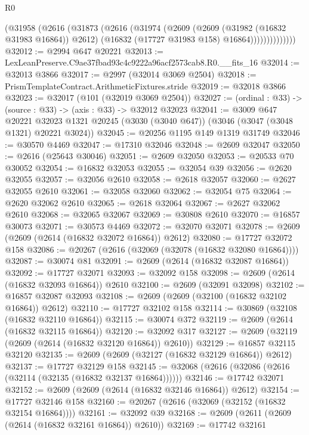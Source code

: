 \begin{lexlean}{R0}
\begin{coremodule}
                  (@31958
                    (@2616
                      (@31873
                        (@2616
                          (@31974
                            (@2609
                              (@2609 (@31982 (@16832 @31983 @16864)) @2612)
                              (@16832 (@17727 @31983 @158) @16864))))))))))))))
@32012 := @2994 @647 @20221
@32013 := LexLeanPreserve.C9ae37fbad93c4c9222a96acf2573cab8.R0.__fits_16
@32014 := @32013 @3866
@32017 := @2997 (@32014 @3069 @2504)
@32018 := PrismTemplateContract.ArithmeticFixtures.stride
@32019 := @32018 @3866
@32023 := @32017 (@101 (@32019 @3069 @2504))
@32027 := (ordinal : @33) -> (source : @33) -> (axis : @33) -> @32012 @32023
@32041 := @3009
    @647
    @20221
    @32023
    @1321
    @20245
    (@3030 (@3040 @647))
    (@3046 (@3047 (@3048 @1321) @20221 @3024))
@32045 := @20256 @1195 @149 @1319 @31749
@32046 := @30570 @4469
@32047 := @17310 @32046
@32048 := @2609 @32047
@32050 := @2616 (@25643 @30046)
@32051 := @2609 @32050
@32053 := @20533 @70 @30052
@32054 := @16832 @32053
@32055 := @32054 @39
@32056 := @2620 @32055
@32057 := @32056 @2610
@32058 := @2618 @32057
@32060 := @2627 @32055 @2610
@32061 := @32058 @32060
@32062 := @32054 @75
@32064 := @2620 @32062 @2610
@32065 := @2618 @32064
@32067 := @2627 @32062 @2610
@32068 := @32065 @32067
@32069 := @30808 @2610
@32070 := @16857 @30073
@32071 := @30573 @4469
@32072 := @32070 @32071
@32078 := @2609 (@2609 (@2614 (@16832 @32072 @16864)) @2612)
@32080 := @17727 @32072 @158
@32086 := @20267 (@2616 (@32069 (@32078 (@16832 @32080 @16864))))
@32087 := @30074 @81
@32091 := @2609 (@2614 (@16832 @32087 @16864))
@32092 := @17727 @32071
@32093 := @32092 @158
@32098 := @2609 (@2614 (@16832 @32093 @16864)) @2610
@32100 := @2609 (@32091 @32098)
@32102 := @16857 @32087 @32093
@32108 := @2609 (@2609 (@32100 (@16832 @32102 @16864)) @2612)
@32110 := @17727 @32102 @158
@32114 := @30869 (@32108 (@16832 @32110 @16864))
@32115 := @30074 @372
@32119 := @2609 (@2614 (@16832 @32115 @16864))
@32120 := @32092 @317
@32127 := @2609 (@32119 (@2609 (@2614 (@16832 @32120 @16864)) @2610))
@32129 := @16857 @32115 @32120
@32135 := @2609 (@2609 (@32127 (@16832 @32129 @16864)) @2612)
@32137 := @17727 @32129 @158
@32145 := @32068 (@2616 (@32086 (@2616 (@32114 (@32135 (@16832 @32137 @16864))))))
@32146 := @17742 @32071
@32152 := @2609 (@2609 (@2614 (@16832 @32146 @16864)) @2612)
@32154 := @17727 @32146 @158
@32160 := @20267 (@2616 (@32069 (@32152 (@16832 @32154 @16864))))
@32161 := @32092 @39
@32168 := @2609 (@2611 (@2609 (@2614 (@16832 @32161 @16864)) @2610))
@32169 := @17742 @32161

\end{coremodule}
\end{lexlean}
